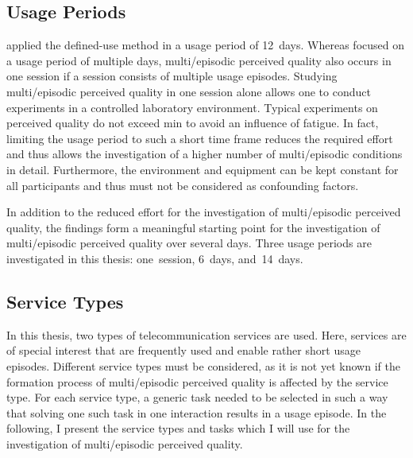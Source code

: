 \subsection{Usage Periods}
\citet{moller_single-call_2011} applied the defined-use method in a usage period of 12~days. 
Whereas \citet{moller_single-call_2011} focused on a usage period of multiple days, multi\-/episodic perceived quality also occurs in one session if a session consists of multiple usage episodes.
Studying multi\-/episodic perceived quality in one session alone allows one to conduct experiments in a controlled laboratory environment. %
Typical experiments on perceived quality do not exceed \unit[90]{min} to avoid an influence of fatigue.
In fact, limiting the usage period to such a short time frame reduces the required effort and thus allows the investigation of a higher number of multi\-/episodic conditions in detail.
Furthermore, the environment and equipment can be kept constant for all participants and thus must not be considered as confounding factors.

In addition to the reduced effort for the investigation of multi\-/episodic perceived quality, the findings form a meaningful starting point for the investigation of multi\-/episodic perceived quality over several days.
Three usage periods are investigated in this thesis: one~session, 6~days, and~14~days.

\subsection{Service Types}
In this thesis, two types of telecommunication services are used.
Here, services are of special interest that are frequently used and enable rather short usage episodes.
Different service types must be considered, as it is not yet known if the formation process of multi\-/episodic perceived quality is affected by the service type.
For each service type, a generic task needed to be selected in such a way that solving one such task in one interaction results in a usage episode.
In the following, I present the service types and tasks which I will use for the investigation of multi\-/episodic perceived quality.


